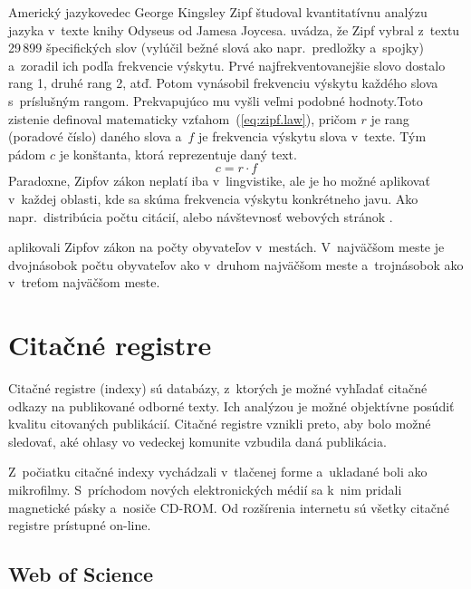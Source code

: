 Americký jazykovedec George Kingsley Zipf študoval kvantitatívnu analýzu jazyka
v~texte knihy Odyseus od Jamesa Joycesa.  \citet{Powers1998} uvádza, že Zipf
vybral z~textu 29\,899 špecifických slov (vylúčil bežné slová ako
napr.~predložky a~spojky) a~zoradil ich podľa frekvencie výskytu.  Prvé
najfrekventovanejšie slovo dostalo rang 1, druhé rang 2, atď.  Potom vynásobil
frekvenciu výskytu každého slova s~príslušným rangom.  Prekvapujúco mu vyšli
veľmi podobné hodnoty.Toto zistenie definoval matematicky
vzťahom~(\ref{eq:zipf.law}), pričom $r$ je rang (poradové číslo) daného slova
a~$f$ je frekvencia výskytu slova v~texte.  Tým pádom $c$ je konštanta, ktorá
reprezentuje daný text.
\begin{equation}
\label{eq:zipf.law}
c = r \cdot f
\end{equation}
Paradoxne, Zipfov zákon neplatí iba v~lingvistike, ale je ho možné aplikovať
v~každej oblasti, kde sa skúma frekvencia výskytu konkrétneho javu.  Ako
napr.~distribúcia počtu citácií, alebo návštevnosť webových stránok
\citep{Li2002}.

\citet{Jiang2014} aplikovali Zipfov zákon na počty obyvateľov v~mestách.
V~najväčšom meste je dvojnásobok počtu obyvateľov ako v~druhom najväčšom meste
a~trojnásobok ako v~treťom najväčšom meste.



\section{Citačné registre}

Citačné registre (indexy) sú databázy, z~ktorých je možné vyhľadať citačné
odkazy na publikované odborné texty.  Ich analýzou je možné objektívne posúdiť
kvalitu citovaných publikácií.  Citačné registre vznikli preto, aby bolo možné
sledovať, aké ohlasy vo vedeckej komunite vzbudila daná publikácia.

Z~počiatku citačné indexy vychádzali v~tlačenej forme a~ukladané boli ako
mikrofilmy.  S~príchodom nových elektronických médií sa k~nim pridali magnetické
pásky a~nosiče CD-ROM.  Od rozšírenia internetu sú všetky citačné registre
prístupné on-line.


\subsection{Web of Science}
\label{sec:wos}

